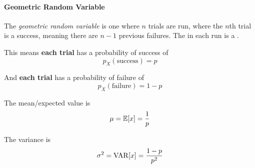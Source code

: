 \paragraph{Geometric Random Variable}\label{par:Geometric_Random_Variable}
\begin{definition}\label{def:Geometric_Random_Variable}
  The \emph{geometric random variable} is one where $n$ trials are run, where the $n$th trial is a success, meaning there are $n-1$ previous failures.
  The  in each run is a .

  This means \textbf{each trial} has a probability of success of
  \begin{equation}\label{eq:Geometric_Random_Variable-Probability_Success}
    p_{X}(\text{success}) = p
  \end{equation}

  And \textbf{each trial} has a probability of failure of
  \begin{equation}\label{eq:Geometric_Random_Variable-Probability_Failure}
    p_{X}(\text{failure}) = 1-p
  \end{equation}

  The mean/expected value is
  \begin{equation}\label{eq:Geometric_Random_Variable-Expected_Value}
    \mu = \operatorname{\operatorname{\mathbb{E}}}[x] = \frac{1}{p}
  \end{equation}

  The variance is
  \begin{equation}\label{eq:Geometric_Random_Variable-Variance}
    \sigma^{2} = \operatorname{\operatorname{VAR}}[x] = \frac{1-p}{p^{2}}
  \end{equation}
\end{definition}

